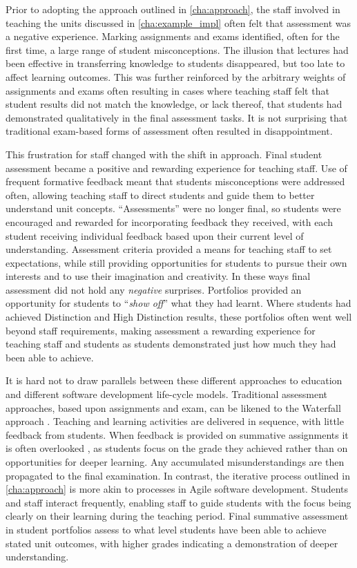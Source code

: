 Prior to adopting the approach outlined in \cref{cha:approach}, the staff involved in teaching the units discussed in \cref{cha:example_impl} often felt that assessment was a negative experience. Marking assignments and exams identified, often for the first time, a large range of student misconceptions. The illusion that lectures had been effective in transferring knowledge to students disappeared, but too late to affect learning outcomes. This was further reinforced by the arbitrary weights of assignments and exams often resulting in cases where teaching staff felt that student results did not match the knowledge, or lack thereof, that students had demonstrated qualitatively in the final assessment tasks. It is not surprising that traditional exam-based forms of assessment often resulted in disappointment.

This frustration for staff changed with the shift in approach. Final student assessment became a positive and rewarding experience for teaching staff. Use of frequent formative feedback meant that students misconceptions were addressed often, allowing teaching staff to direct students and guide them to better understand unit concepts. ``Assessments'' were no longer final, so students were encouraged and rewarded for incorporating feedback they received, with each student receiving individual feedback based upon their current level of understanding. Assessment criteria provided a means for teaching staff to set expectations, while still providing opportunities for students to pursue their own interests and to use their imagination and creativity. In these ways final assessment did not hold any \emph{negative} surprises. Portfolios provided an opportunity for students to ``\emph{show off}'' what they had learnt. Where students had achieved Distinction and High Distinction results, these portfolios often went well beyond staff requirements, making assessment a rewarding experience for teaching staff and students as students demonstrated just how much they had been able to achieve.

It is hard not to draw parallels between these different approaches to education and different software development life-cycle models. Traditional assessment approaches, based upon assignments and exam, can be likened to the Waterfall approach \cite{Royce:1970}. Teaching and learning activities are delivered in sequence, with little feedback from students. When feedback is provided on summative assignments it is often overlooked \cite{Black:1998}, as students focus on the grade they achieved rather than on opportunities for deeper learning. Any accumulated misunderstandings are then propagated to the final examination. In contrast, the iterative process outlined in \cref{cha:approach} is more akin to processes in Agile software development. Students and staff interact frequently, enabling staff to guide students with the focus being clearly on their learning during the teaching period. Final summative assessment in student portfolios assess to what level students have been able to achieve stated unit outcomes, with higher grades indicating a demonstration of deeper understanding.

